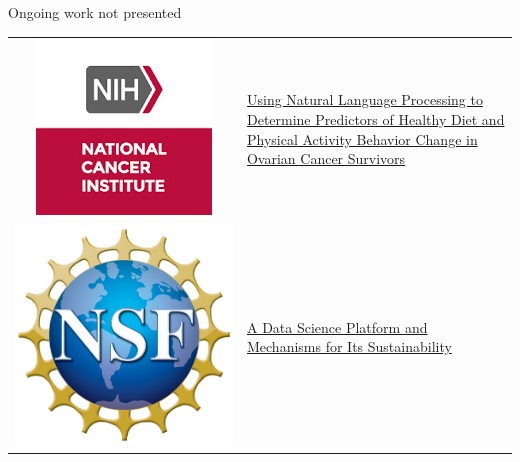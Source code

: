 \documentclass[14pt]{beamer}
\begin{document}
\begin{frame}{Ongoing work not presented}
\begin{tabular}{ @{} c p{} @{}}
\includegraphics[trim=40 20 40 20, clip, height=.15\textheight, valign=t]{nih_nci.jpg}
&
\href{https://reporter.nih.gov/project-details/10510666}{Using Natural Language Processing to Determine Predictors of Healthy Diet and Physical Activity Behavior Change in Ovarian Cancer Survivors}
\\[6.5ex]

\includegraphics[trim=50 50 50 50, clip, height=.1\textheight, valign=t]{nsf.png}
&
\href{https://www.nsf.gov/awardsearch/showAward?AWD_ID=1831551}{A Data Science Platform and Mechanisms for Its Sustainability}
\\[4ex]


\end{tabular}
\end{frame}
\end{document}
